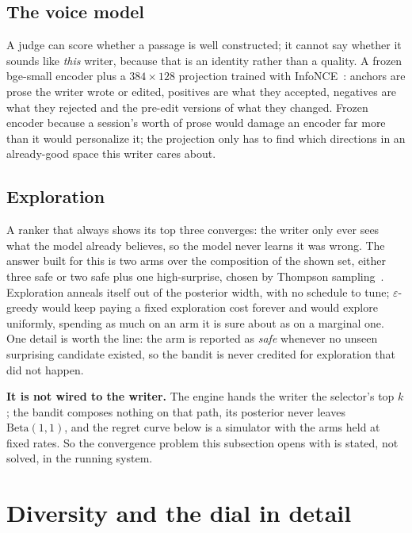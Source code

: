 \documentclass{article}
\begin{document}
\subsection{The voice model}

A judge can score whether a passage is well constructed; it cannot say whether it sounds
like \emph{this} writer, because that is an identity rather than a quality. A frozen
bge-small encoder plus a $384 \times 128$ projection trained with
InfoNCE~\cite{oord2018cpc}: anchors are prose the writer wrote or edited, positives are what
they accepted, negatives are what they rejected and the pre-edit versions of what they
changed. Frozen encoder because a session's worth of prose would damage an encoder far more
than it would personalize it; the projection only has to find which directions in an
already-good space this writer cares about.


\subsection{Exploration}

A ranker that always shows its top three converges: the writer only ever sees what the model
already believes, so the model never learns it was wrong. The answer built for this is two
arms over the composition of the shown set, either three safe or two safe plus one
high-surprise, chosen by Thompson sampling~\cite{russo2018thompson}. Exploration anneals
itself out of the posterior width, with no schedule to tune; $\varepsilon$-greedy would keep
paying a fixed exploration cost forever and would explore uniformly, spending as much on an
arm it is sure about as on a marginal one. One detail is worth the line: the arm is reported
as \emph{safe} whenever no unseen surprising candidate existed, so the bandit is never
credited for exploration that did not happen.

\textbf{It is not wired to the writer.} The engine hands the writer the selector's top
$k$; the bandit composes nothing on that path, its posterior never leaves
$\mathrm{Beta}(1,1)$, and the regret curve below is a simulator with the arms held at fixed
rates. So the convergence problem this subsection opens with is stated, not solved, in the
running system. 


\section{Diversity and the dial in detail}
\label{app:diversity}
\end{document}
